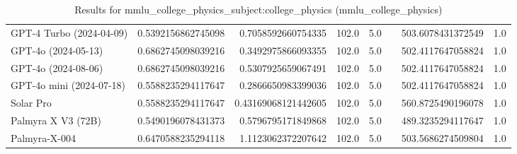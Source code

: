 \begin{table}[htp]
{\begin{tabular}{lrrrrrrr}
GPT-4 Turbo (2024-04-09) & 0.5392156862745098 & 0.7058592660754335 & 102.0 & 5.0 &  & 503.6078431372549 & 1.0 \\
GPT-4o (2024-05-13) & 0.6862745098039216 & 0.3492975866093355 & 102.0 & 5.0 &  & 502.4117647058824 & 1.0 \\
GPT-4o (2024-08-06) & 0.6862745098039216 & 0.5307925659067491 & 102.0 & 5.0 &  & 502.4117647058824 & 1.0 \\
GPT-4o mini (2024-07-18) & 0.5588235294117647 & 0.2866650983399036 & 102.0 & 5.0 &  & 502.4117647058824 & 1.0 \\
Solar Pro & 0.5588235294117647 & 0.43169068121442605 & 102.0 & 5.0 &  & 560.8725490196078 & 1.0 \\
Palmyra X V3 (72B) & 0.5490196078431373 & 0.5796795171849868 & 102.0 & 5.0 &  & 489.3235294117647 & 1.0 \\
Palmyra-X-004 & 0.6470588235294118 & 1.1123062372207642 & 102.0 & 5.0 &  & 503.5686274509804 & 1.0 \\
\bottomrule
\end{tabular}}
\caption{Results for mmlu_college_physics_subject:college_physics (mmlu_college_physics)}
\label{fig:mmlu_college_physics_subject:college_physics (mmlu_college_physics)}
\end{table}